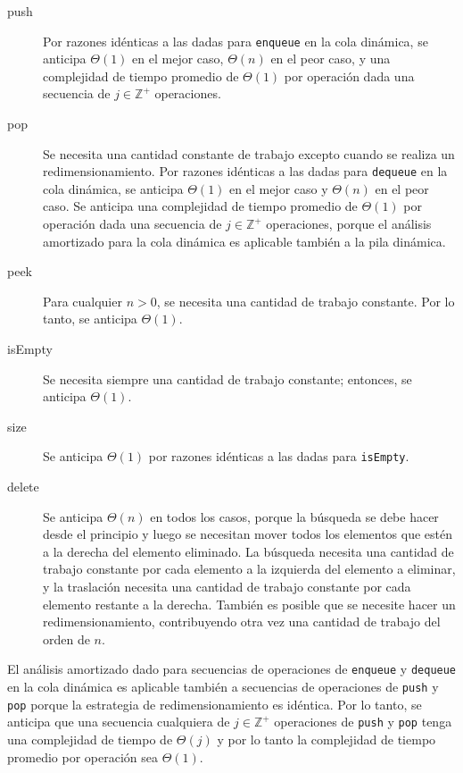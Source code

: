 \begin{description}
	\item[push]{
		Por razones idénticas a las dadas para \texttt{enqueue} en la cola dinámica, se anticipa $\Theta{}(1)$ en el mejor caso, $\Theta{}(n)$ en el peor caso, y una complejidad de tiempo promedio de $\Theta{}(1)$ por operación dada una secuencia de $j \in \mathbb{Z}^{+}$ operaciones.
	}
	\item[pop]{
		Se necesita una cantidad constante de trabajo excepto cuando se realiza un redimensionamiento. Por razones idénticas a las dadas para \texttt{dequeue} en la cola dinámica, se anticipa $\Theta{}(1)$ en el mejor caso y $\Theta{}(n)$ en el peor caso. Se anticipa una complejidad de tiempo promedio de $\Theta{}(1)$ por operación dada una secuencia de $j \in \mathbb{Z}^{+}$ operaciones, porque el análisis amortizado para la cola dinámica es aplicable también a la pila dinámica.
	}
	\item[peek]{
		Para cualquier $n > 0$, se necesita una cantidad de trabajo constante. Por lo tanto, se anticipa $\Theta{}(1)$.
	}
	\item[isEmpty]{
		Se necesita siempre una cantidad de trabajo constante; entonces, se anticipa $\Theta{}(1)$.
	}
	\item[size]{
		Se anticipa $\Theta{}(1)$ por razones idénticas a las dadas para \texttt{isEmpty}.
	}
	\item[delete]{
		Se anticipa $\Theta{}(n)$ en todos los casos, porque la búsqueda se debe hacer desde el principio y luego se necesitan mover todos los elementos que estén a la derecha del elemento eliminado. La búsqueda necesita una cantidad de trabajo constante por cada elemento a la izquierda del elemento a eliminar, y la traslación necesita una cantidad de trabajo constante por cada elemento restante a la derecha. También es posible que se necesite hacer un redimensionamiento, contribuyendo otra vez una cantidad de trabajo del orden de $n$.
	}
\end{description}

El análisis amortizado dado para secuencias de operaciones de \texttt{enqueue} y \texttt{dequeue} en la cola dinámica es aplicable también a secuencias de operaciones de \texttt{push} y \texttt{pop} porque la estrategia de redimensionamiento es idéntica. Por lo tanto, se anticipa que una secuencia cualquiera de $j \in \mathbb{Z}^{+}$ operaciones de \texttt{push} y \texttt{pop} tenga una complejidad de tiempo de $\Theta{}(j)$ y por lo tanto la complejidad de tiempo promedio por operación sea $\Theta{}(1)$.

